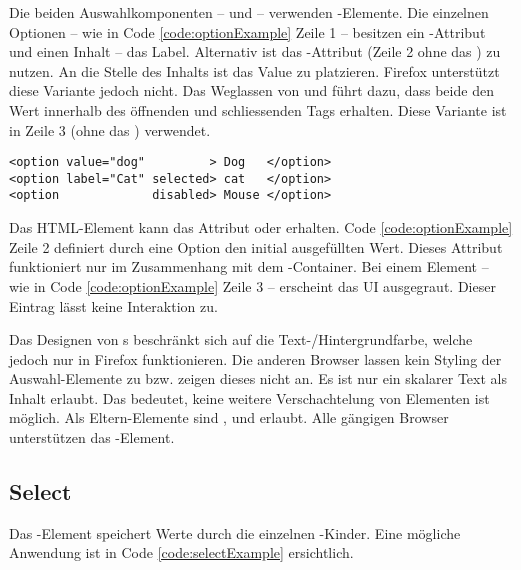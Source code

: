 Die beiden Auswahlkomponenten –  und  – verwenden -Elemente. 
Die einzelnen Optionen – wie in Code \ref{code:optionExample} Zeile 1 – besitzen ein -Attribut und einen Inhalt – das Label. 
Alternativ ist das -Attribut (Zeile 2 ohne das ) zu nutzen. 
An die Stelle des Inhalts ist das Value zu platzieren. 
Firefox unterstützt diese Variante jedoch nicht. 
Das Weglassen von  und  führt dazu, dass beide den Wert innerhalb des öffnenden und schliessenden Tags erhalten. 
Diese Variante ist in Zeile 3 (ohne das ) verwendet. 

\begin{lstlisting}[style = htmlcssjs, caption = Beispiel – Option, label = code:optionExample]
<option value="dog"         > Dog   </option>
<option label="Cat" selected> cat   </option>
<option             disabled> Mouse </option>
\end{lstlisting} 

Das HTML-Element kann das Attribut  oder  erhalten. 
Code \ref{code:optionExample} Zeile 2 definiert durch eine  Option den initial ausgefüllten Wert. 
Dieses Attribut funktioniert nur im Zusammenhang mit dem -Container.
Bei einem  Element – wie in Code \ref{code:optionExample} Zeile 3 – erscheint das UI ausgegraut. 
Dieser Eintrag lässt keine Interaktion zu. 

Das Designen von s beschränkt sich auf die Text-/Hintergrundfarbe, welche jedoch nur in Firefox funktionieren. 
Die anderen Browser lassen kein Styling der Auswahl-Elemente zu bzw. zeigen dieses nicht an. 
Es ist nur ein skalarer Text als Inhalt erlaubt. 
Das bedeutet, keine weitere Verschachtelung von Elementen ist möglich. 
Als Eltern-Elemente sind ,  und  erlaubt. 
Alle gängigen Browser unterstützen das -Element. 


\subsection{Select}
\label{sec:select}

Das -Element speichert Werte durch die einzelnen -Kinder. 
Eine mögliche Anwendung ist in Code \ref{code:selectExample} ersichtlich. 

